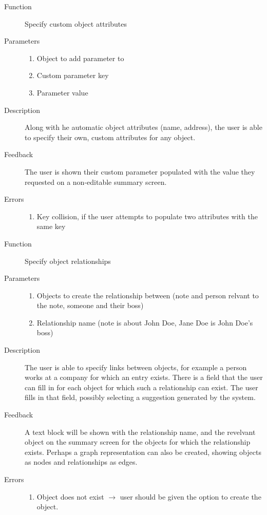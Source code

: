 \documentclass[12pt, letter]{article}
\begin{document}
\begin{description}
\item[Function] Specify custom object attributes 
\item[Parameters]\hfill \begin{enumerate} \item Object to add parameter to \item Custom parameter key \item Parameter value \end{enumerate}
\item[Description] 	Along with he automatic object attributes (name, address), the user is able to specify their own, custom attributes for any object.
\item[Feedback] The user is shown their custom parameter populated with the value they requested on a non-editable summary screen.
\item[Errors] \hfill \begin{enumerate} \item Key collision, if the user attempts to populate two attributes with the same key\end{enumerate}
\end{description}

\hfill


\begin{description}
\item[Function]  Specify object relationships
\item[Parameters] \hfill \begin{enumerate} \item Objects to create the relationship between (note and person relvant to the note, someone and their boss) \item Relationship name (note is about John Doe, Jane Doe is John Doe's boss) \end{enumerate}
\item[Description] 	The user is able to specify links between objects, for example a person works at a company for which an entry exists. There is a field that the user can fill in for each object for which such a relationship can exist.  The user fills in that field, possibly selecting a suggestion generated by the system.
\item[Feedback] A text block will be shown with the relationship name, and the revelvant object on the summary screen for the objects for which the relationship exists.  Perhaps a graph representation can also be created, showing objects as nodes and relationships as edges.
\item[Errors] \hfill \begin{enumerate} \item Object does not exist $\to$ user should be given the option to create the object. \end{enumerate}
\end{description}
\end{document}
